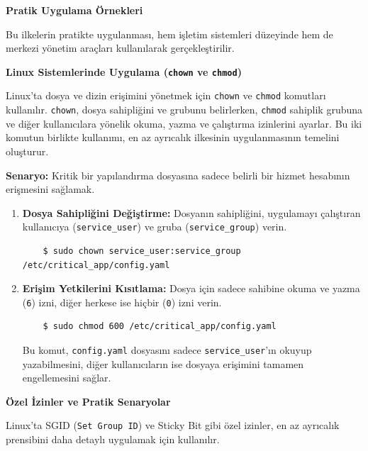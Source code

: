 \textbf{Pratik Uygulama Örnekleri}

Bu ilkelerin pratikte uygulanması, hem işletim sistemleri düzeyinde hem de merkezi yönetim araçları kullanılarak gerçekleştirilir.

\textbf{Linux Sistemlerinde Uygulama (\texttt{chown} ve \texttt{chmod})}

Linux’ta dosya ve dizin erişimini yönetmek için \texttt{chown} ve \texttt{chmod} komutları kullanılır. \texttt{chown}, dosya sahipliğini ve grubunu belirlerken, \texttt{chmod} sahiplik grubuna ve diğer kullanıcılara yönelik okuma, yazma ve çalıştırma izinlerini ayarlar. Bu iki komutun birlikte kullanımı, en az ayrıcalık ilkesinin uygulanmasının temelini oluşturur.

\textbf{Senaryo:} Kritik bir yapılandırma dosyasına sadece belirli bir hizmet hesabının erişmesini sağlamak.

\begin{enumerate}
    \item \textbf{Dosya Sahipliğini Değiştirme:} Dosyanın sahipliğini, uygulamayı çalıştıran kullanıcıya (\texttt{service\_user}) ve gruba (\texttt{service\_group}) verin.
    \begin{verbatim}
    $ sudo chown service_user:service_group /etc/critical_app/config.yaml
    \end{verbatim}
    \item \textbf{Erişim Yetkilerini Kısıtlama:} Dosya için sadece sahibine okuma ve yazma (\texttt{6}) izni, diğer herkese ise hiçbir (\texttt{0}) izni verin.
    \begin{verbatim}
    $ sudo chmod 600 /etc/critical_app/config.yaml
    \end{verbatim}
    Bu komut, \texttt{config.yaml} dosyasını sadece \texttt{service\_user}'ın okuyup yazabilmesini, diğer kullanıcıların ise dosyaya erişimini tamamen engellemesini sağlar.
\end{enumerate}

\textbf{Özel İzinler ve Pratik Senaryolar}

Linux'ta SGID (\texttt{Set Group ID}) ve Sticky Bit gibi özel izinler, en az ayrıcalık prensibini daha detaylı uygulamak için kullanılır.

